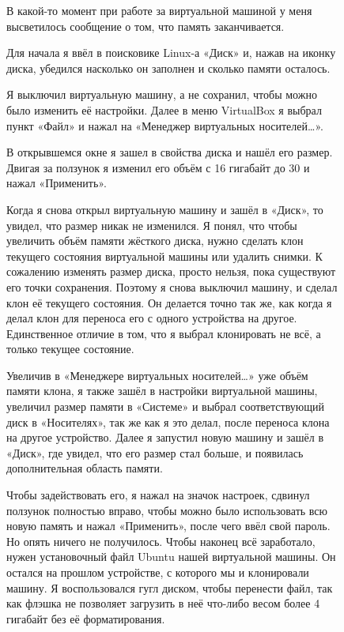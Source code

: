\documentclass[oneside,final,12pt]{extarticle} %
\begin{document}
\begin{figure}
\quad В какой-то момент при работе за виртуальной машиной у меня высветилось сообщение о том, что память заканчивается. 
\end{figure}

\begin{figure}
\quad Для начала я ввёл в поисковике Linux-а «Диск» и, нажав на иконку диска, убедился насколько он заполнен и сколько памяти осталось. 
\end{figure}

\begin{figure}
\quad Я выключил виртуальную машину, а не сохранил, чтобы можно было изменить её настройки. Далее в меню VirtualBox я выбрал пункт «Файл» и нажал на «Менеджер виртуальных носителей…».
\end{figure}

\begin{figure}
\quad В открывшемся окне я зашел в свойства диска и нашёл его размер. Двигая за ползунок я изменил его объём с 16 гигабайт до 30 и нажал «Применить». 
\end{figure}

\begin{figure}
\quad Когда я снова открыл виртуальную машину и зашёл в «Диск», то увидел, что размер никак не изменился. Я понял, что чтобы увеличить объём памяти жёсткого диска, нужно сделать клон текущего состояния виртуальной машины или удалить снимки. К сожалению изменять размер диска, просто нельзя, пока существуют его точки сохранения. Поэтому я снова выключил машину, и сделал клон её текущего состояния. Он делается точно так же, как когда я делал клон для переноса его с одного устройства на другое. Единственное отличие в том, что я выбрал клонировать не всё, а только текущее состояние. 
\end{figure}

\begin{figure}
\quad Увеличив в «Менеджере виртуальных носителей…» уже объём памяти клона, я также зашёл в настройки виртуальной машины, увеличил размер памяти в «Системе» и выбрал соответствующий диск в «Носителях», так же как я это делал, после переноса клона на другое устройство. Далее я запустил новую машину и зашёл в «Диск», где увидел, что его размер стал больше, и появилась дополнительная область памяти.
\end{figure}

\begin{figure}
\quad Чтобы задействовать его, я нажал на значок настроек, сдвинул ползунок полностью вправо, чтобы можно было использовать всю новую память и нажал «Применить», после чего ввёл свой пароль. Но опять ничего не получилось. Чтобы наконец всё заработало, нужен установочный файл Ubuntu нашей виртуальной машины. Он остался на прошлом устройстве, с которого мы и клонировали машину. Я воспользовался гугл диском, чтобы перенести файл, так как флэшка не позволяет загрузить в неё что-либо весом более 4 гигабайт без её форматирования.
\end{figure}
\end{document}
